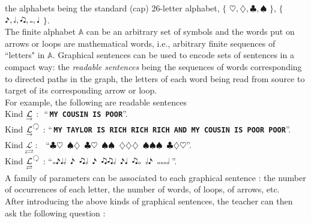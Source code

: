 \documentclass{article}
\begin{document}
\noindent the alphabets being the standard (cap) 26-letter alphabet,  $\{$ {\boldmath ${\heartsuit, \diamondsuit,  \clubsuit, \spadesuit}$} $\}$, $\{$ {\boldmath ${\eighthnote,\halfnote,\twonotes,\fullnote,\quarternote}$} $\}$.\\

\noindent The finite alphabet $\mathbb{A}$ can be an arbitrary set of symbols and the words put on arrows or loops are mathematical words, i.e., arbitrary finite sequences of ``letters" in $\mathbb{A}$. Graphical sentences can be used to encode sets of sentences in a compact way: the \emph{readable sentences} being the sequences of words corresponding to directed paths in the graph, the letters of each word being read from source to target of its corresponding arrow or loop.\\

\noindent For example, the following are readable sentences\\

\noindent Kind $\underset{\raisebox{0.4ex}{$\scriptstyle \rightarrow $}}{\mathcal{L}}$ : \,\,``\,{\texttt{\textbf{MY COUSIN IS POOR}}}''.\\
Kind $\underset{\raisebox{0.4ex}{$\scriptstyle \rightarrow $}}{\mathcal{L}}^{\rotatebox[origin=c]{-180}{$\circlearrowright$}}$ : ``\,{\texttt{\textbf{MY TAYLOR IS RICH RICH RICH AND MY COUSIN IS POOR POOR}}}''.\\
Kind $\underset{\rightleftarrows}{\mathcal{L}}$ : \,\,\,\,``$\clubsuit  \heartsuit \, \,\,   \spadesuit \diamondsuit \,\,\, \clubsuit  \heartsuit \,\,\, \spadesuit \spadesuit \,\,\, \diamondsuit \diamondsuit \diamondsuit \,\,\, \spadesuit \spadesuit  \spadesuit \,\,\,\clubsuit \diamondsuit \heartsuit $''.\\
Kind $\underset{\rightleftarrows}{\mathcal{L}}^{\rotatebox[origin=c]{-180}{$\circlearrowright$}}$ :  ``$\fullnote \eighthnote \quarternote \halfnote \,\,\, \eighthnote \,\,\, \twonotes  \halfnote \,\,\, \eighthnote \,\,\, \twonotes \twonotes \halfnote \,\,\, \eighthnote \quarternote \,\,\,  \twonotes \fullnote \,\,\, \halfnote \eighthnote \,\,\,  \fullnote \fullnote \fullnote \halfnote$\,''.\\

\noindent A family of parameters can be associated to each graphical sentence : the number of occurrences of each letter, the number of words, of loops, of arrows, etc. 
\\

 After introducing the above kinds of graphical sentences, the teacher can then ask the following question :\\
\end{document}
